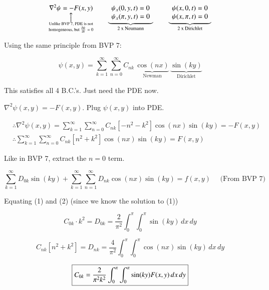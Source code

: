 \documentclass{report}
\makeatletter
\newcommand\parrow[3][3ex]{%
 \begin{array}[t]{@{}c@{}} #2 \\
  \left\uparrow\vcenter{\hrule height #1}\right.\kern-\nulldelimiterspace\\
  \makebox[0pt]{\small#3}
  \end{array}%
}
\makeatother
\begin{document}
$$\parrow{\nabla^2\psi=-F(x,y)}{$\substack{\text{Unlike BVP 7, PDE is not}\\
\text{homogeneous, but $\frac{\partial\psi}{\partial t}=0$}}$}\qquad \underbrace{\begin{array}[t]{l}
     \psi_x(0,y,t)=0 \\
     \psi_x(\pi,y,t)=0
\end{array}}_{\text{2 x Neumann}} \qquad \underbrace{\begin{array}[t]{l}
     \psi(x,0,t)=0 \\
     \psi(x,\pi,t)=0
\end{array}}_{\text{2 x Dirichlet}}$$

Using the same principle from BVP 7:


\[
\boxed{
\psi(x, y)=\sum_{k=1}^{\infty} \sum_{n=0}^{\infty} C_{nk}\,
\underbrace{\cos (n x)}_{\text{Newman}}\, \underbrace{\sin (k y)}_{\text{Dirichlet}}
}
\]

This satisfies all 4 B.C.'s. Just need the PDE now.

$\nabla^{2} \psi(x, y)=-F(x, y)$. Plug $\psi(x, y)$ into PDE.


\begin{align*}
& \therefore \nabla^{2} \psi(x, y)=\sum\limits_{k=1}^{\infty} \sum\limits_{n=0}^{\infty} C_{n k}\left[-n^{2}-k^{2}\right] \cos (n x) \sin (k y)=-F(x, y) \\
& \therefore \sum\limits_{k=1}^{\infty} \sum\limits_{n=0}^{\infty} C_{n k}\left[n^{2}+k^{2}\right] \cos (n x) \sin (k y)=F(x, y) \tag{1}
\end{align*}


Like in BVP 7, extract the $n=0$ term.

\begin{equation}\tag{2}
    \sum_{k=1}^{\infty} D_{0 k} \sin (k y)+\sum\limits_{k=1}^{\infty} \sum\limits_{n=1}^{\infty} D_{n k} \cos (n x) \sin (k y)=f(x, y) \quad \text { (From BVP 7) }
\end{equation}

Equating (1) and (2) (since we know the solution to (1))

$$
C_{0k} \cdot k^{2} = D_{0k}=\dfrac{2}{\pi^{2}} \int_{0}^{\pi} \int_{0}^{\pi} \sin(ky)\,dx\,dy
$$

$$
C_{nk}\left[n^{2}+k^{2}\right] = D_{nk}=\dfrac{4}{\pi^{2}} \int_{0}^{\pi} \int_{0}^{\pi} \cos(nx)\sin(ky)\,dx\,dy
$$

$$
\boxed{C_{0k}=\dfrac{2}{\pi^{2}k^{2}} \int_{0}^{\pi}\int_{0}^{\pi}\sin(ky)F(x,y)\,dx\,dy}\\[1ex]
$$
\end{document}
